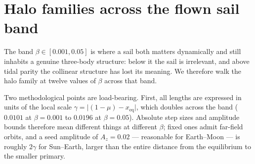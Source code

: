 \documentclass[11pt,a4paper]{article}
\begin{document}
\section{Halo families across the flown sail band}\label{sec:families}

The band $\beta\in[0.001,0.05]$ is where a sail both matters dynamically and
still inhabits a genuine three-body structure: below it the sail is irrelevant,
and above tidal parity the collinear structure has lost its meaning. We
therefore walk the halo family at twelve values of $\beta$ across that band.

Two methodological points are load-bearing. First, all lengths are expressed in
units of the local scale $\gamma=\lvert(1-\mu)-x_{\mathrm{eq}}\rvert$, which
doubles across the band ($0.0101$ at $\beta=0.001$ to $0.0196$ at $\beta=0.05$).
Absolute step sizes and amplitude bounds therefore mean different things at
different $\beta$; fixed ones admit far-field orbits, and a seed amplitude of
$A_z=0.02$ --- reasonable for Earth--Moon --- is roughly $2\gamma$ for
Sun--Earth, larger than the entire distance from the equilibrium to the smaller
primary.
\end{document}
